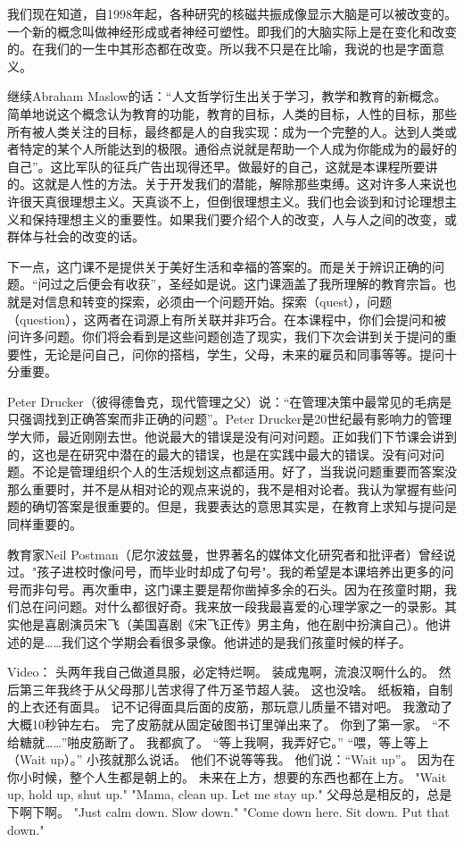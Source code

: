 我们现在知道，自1998年起，各种研究的核磁共振成像显示大脑是可以被改变的。一个新的概念叫做神经形成或者神经可塑性。即我们的大脑实际上是在变化和改变的。在我们的一生中其形态都在改变。所以我不只是在比喻，我说的也是字面意义。

继续Abraham Maslow的话：“人文哲学衍生出关于学习，教学和教育的新概念。简单地说这个概念认为教育的功能，教育的目标，人类的目标，人性的目标，那些所有被人类关注的目标，最终都是人的自我实现：成为一个完整的人。达到人类或者特定的某个人所能达到的极限。通俗点说就是帮助一个人成为你能成为的最好的自己”。这比军队的征兵广告出现得还早。做最好的自己，这就是本课程所要讲的。这就是人性的方法。关于开发我们的潜能，解除那些束缚。这对许多人来说也许很天真很理想主义。天真谈不上，但倒很理想主义。我们也会谈到和讨论理想主义和保持理想主义的重要性。如果我们要介绍个人的改变，人与人之间的改变，或群体与社会的改变的话。

下一点，这门课不是提供关于美好生活和幸福的答案的。而是关于辨识正确的问题。“问过之后便会有收获”，圣经如是说。这门课涵盖了我所理解的教育宗旨。也就是对信息和转变的探索，必须由一个问题开始。探索（quest），问题（question），这两者在词源上有所关联并非巧合。在本课程中，你们会提问和被问许多问题。你们将会看到是这些问题创造了现实，我们下次会讲到关于提问的重要性，无论是问自己，问你的搭档，学生，父母，未来的雇员和同事等等。提问十分重要。

Peter Drucker（彼得德鲁克，现代管理之父）说：“在管理决策中最常见的毛病是只强调找到正确答案而非正确的问题”。Peter Drucker是20世纪最有影响力的管理学大师，最近刚刚去世。他说最大的错误是没有问对问题。正如我们下节课会讲到的，这也是在研究中潜在的最大的错误，也是在实践中最大的错误。没有问对问题。不论是管理组织个人的生活规划这点都适用。好了，当我说问题重要而答案没那么重要时，并不是从相对论的观点来说的，我不是相对论者。我认为掌握有些问题的确切答案是很重要的。但是，我要表达的意思其实是，在教育上求知与提问是同样重要的。

教育家Neil Postman（尼尔波兹曼，世界著名的媒体文化研究者和批评者）曾经说过。"孩子进校时像问号，而毕业时却成了句号"。我的希望是本课培养出更多的问号而非句号。再次重申，这门课主要是帮你凿掉多余的石头。因为在孩童时期，我们总在问问题。对什么都很好奇。我来放一段我最喜爱的心理学家之一的录影。其实他是喜剧演员宋飞（美国喜剧《宋飞正传》男主角，他在剧中扮演自己）。他讲述的是……我们这个学期会看很多录像。他讲述的是我们孩童时候的样子。

Video：
头两年我自己做道具服，必定特烂啊。  
装成鬼啊，流浪汉啊什么的。  
然后第三年我终于从父母那儿苦求得了件万圣节超人装。  
这也没啥。  
纸板箱，自制的上衣还有面具。  
记不记得面具后面的皮筋，那玩意儿质量不错对吧。  
我激动了大概10秒钟左右。  
完了皮筋就从固定破图书订里弹出来了。  
你到了第一家。  
“不给糖就……”啪皮筋断了。  
我都疯了。  
“等上我啊，我弄好它。”  
“喂，等上等上（Wait up）。”  
小孩就那么说话。  
他们不说等等我。  
他们说：“Wait up”。  
因为在你小时候，整个人生都是朝上的。  
未来在上方，想要的东西也都在上方。  
"Wait up, hold up, shut up."  
"Mama, clean up. Let me stay up."  
父母总是相反的，总是下啊下啊。  
"Just calm down. Slow down."  
"Come down here. Sit down. Put that down."  

